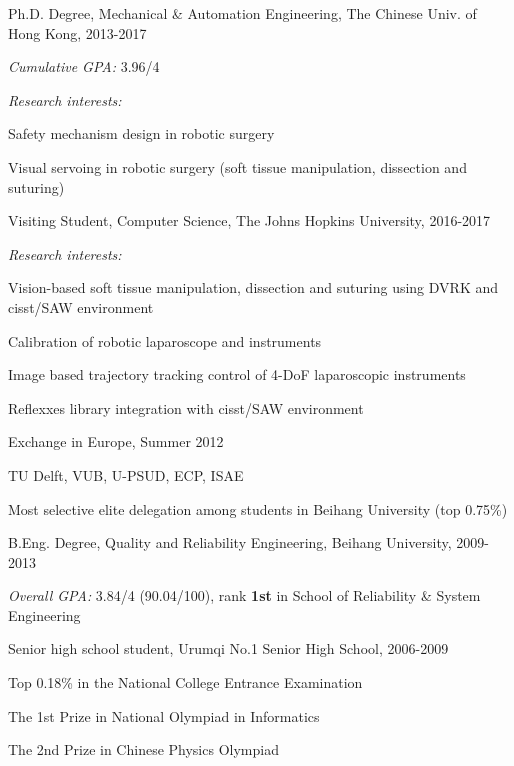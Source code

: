 \documentclass[10pt,letterpaper]{article}
\renewenvironment{itemize}{
  \begin{list}{}{
    \setlength{\leftmargin}{1.5em}
    \setlength{\itemsep}{0.25em}
    \setlength{\parskip}{0pt}
    \setlength{\parsep}{0.25em}
  }
}{
  \end{list}
}
\begin{document}
\begin{itemize}
  \item Ph.D. Degree, Mechanical \& Automation Engineering, The Chinese Univ. of Hong Kong, 2013-2017
    \begin{itemize}
    \item \emph{Cumulative GPA:} 3.96/4
    \item \emph{Research interests:}
      \begin{itemize}
      \item Safety mechanism design in robotic surgery
      \item Visual servoing in robotic surgery (soft tissue manipulation, dissection and suturing)
      \end{itemize}
    \end{itemize}
  \item Visiting Student, Computer Science, The Johns Hopkins University, 2016-2017
    \begin{itemize}
    \item \emph{Research interests:}
      \begin{itemize}
      \item Vision-based soft tissue manipulation, dissection and suturing using DVRK and cisst/SAW environment
      \item Calibration of robotic laparoscope and instruments
      \item Image based trajectory tracking control of 4-DoF laparoscopic instruments
      \item Reflexxes library integration with cisst/SAW environment
      \end{itemize}
    \end{itemize}
  \item Exchange in Europe, Summer 2012
    \begin{itemize}
    \item TU Delft, VUB, U-PSUD, ECP, ISAE
    \item Most selective elite delegation among students in Beihang University (top 0.75\%)
    \end{itemize}
  \item B.Eng. Degree, Quality and Reliability Engineering, Beihang University, 2009-2013
    \begin{itemize}
    \item \emph{Overall GPA:} 3.84/4 (90.04/100), rank \textbf{1st} in School of Reliability \& System Engineering
    \end{itemize}
  \item Senior high school student, Urumqi No.1 Senior High School, 2006-2009
    \begin{itemize}
    \item Top 0.18\% in the National College Entrance Examination
    \item The 1st Prize in National Olympiad in Informatics
    \item The 2nd Prize in Chinese Physics Olympiad
    \end{itemize}
\end{itemize}
\end{document}
